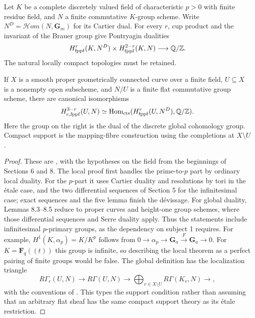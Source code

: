 \begin{theorem}\label{thm:B3-flat-duality}
Let $K$ be a complete discretely valued field of characteristic $p>0$
with finite residue field, and $N$ a finite commutative $K$-group
scheme. Write $N^D=\mathcal Hom(N,\mathbf G_m)$ for its Cartier dual.
For every $r$, cup product and the invariant of the Brauer group give
Pontryagin dualities
\[
 H^r_{\mathrm{fppf}}(K,N^D)\times
 H^{2-r}_{\mathrm{fppf}}(K,N)\longrightarrow{\ensuremath{\mathbb{Q}}}/{\mathbb{Z}}.
\]
The natural locally compact topologies must be retained.

If $X$ is a smooth proper geometrically connected curve over a finite
field, $U\subseteq X$ is a nonempty open subscheme, and $N/U$ is a
finite flat commutative group scheme, there are canonical
isomorphisms
\[
 H^{3-r}_{c,\mathrm{fppf}}(U,N)
 \simeq\operatorname{Hom}_{\mathrm{cts}}
 (H^r_{\mathrm{fppf}}(U,N^D),{\mathbb{Q}}/{\mathbb{Z}}).
\]
Here the group on the right is the dual of the discrete global
cohomology group. Compact support is the mapping-fibre construction
using the completions at $X\setminus U$.
\end{theorem}
\begin{proof}
These are \cite[III, Theorem 6.10, p.~277; Theorem 8.2,
p.~290]{BMilneADT}, with the hypotheses on the field from the
beginnings of Sections 6 and 8. The local proof first handles the
prime-to-$p$ part by ordinary local duality. For the $p$-part it
uses Cartier duality and resolutions by tori in the \'etale case,
and the two differential sequences of Section 5 for the infinitesimal
case; exact sequences and the five lemma finish the d\'evissage.
For global duality, Lemmas 8.3--8.5 reduce to proper curves and
height-one group schemes, where those differential sequences and
Serre duality apply. Thus the statements include infinitesimal
$p$-primary groups, as the dependency on subject 1 requires.
For example, $H^1(K,\alpha_p)=K/K^p$ follows from
$0\to\alpha_p\to\mathbf G_a\xrightarrow{F}\mathbf G_a\to0$.
For $K=\mathbf F_q((t))$ this group is infinite, so describing the
local theorem as a perfect pairing of finite groups would be false.
The global definition has the localization triangle
\[
 R\Gamma_c(U,N)\to R\Gamma(U,N)\to
 \bigoplus_{v\in X\setminus U}R\Gamma(K_v,N)\longrightarrow,
\]
with the conventions of \cite[III, Section 0.6(b)]{BMilneADT}.
This types the support condition rather than assuming that an
arbitrary flat sheaf has the same compact support theory as its
\'etale restriction.
\end{proof}

